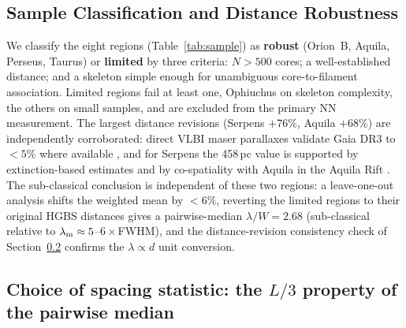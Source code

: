 \documentclass[usenatbib,twoside,twocolumn]{mnras}
\begin{document}
\subsection{Sample Classification and Distance Robustness}
\label{sec:distance_uncertainties}

We classify the eight regions (Table~\ref{tab:sample}) as \textbf{robust} (Orion~B, Aquila, Perseus, Taurus) or \textbf{limited} by three criteria: $N>500$ cores; a well-established distance; and a skeleton simple enough for unambiguous core-to-filament association. Limited regions fail at least one, Ophiuchus on skeleton complexity, the others on small samples, and are excluded from the primary NN measurement. The largest distance revisions (Serpens $+76\%$, Aquila $+68\%$) are independently corroborated: direct VLBI maser parallaxes validate Gaia DR3 to $<5\%$ where available \citep{Kounkel2018,Xu2021,OrtizLeon2018,OrtizLeon2017}, and for Serpens the 458\,pc value is supported by extinction-based estimates \citep[$440$--$460$\,pc;][]{Yan2022,Green2024} and by co-spatiality with Aquila in the Aquila Rift \citep{Zucker2020}. The sub-classical conclusion is independent of these two regions: a leave-one-out analysis shifts the weighted mean by $<6\%$, reverting the limited regions to their original HGBS distances gives a pairwise-median $\lambda/W=2.68$ (sub-classical relative to $\lambda_{\rm m}\approx5$--$6\times$FWHM), and the distance-revision consistency check of Section~\ref{sec:statistics} confirms the $\lambda\propto d$ unit conversion.


\subsection{Choice of spacing statistic: the $L/3$ property of the pairwise median}
\label{sec:statistics}
\end{document}
